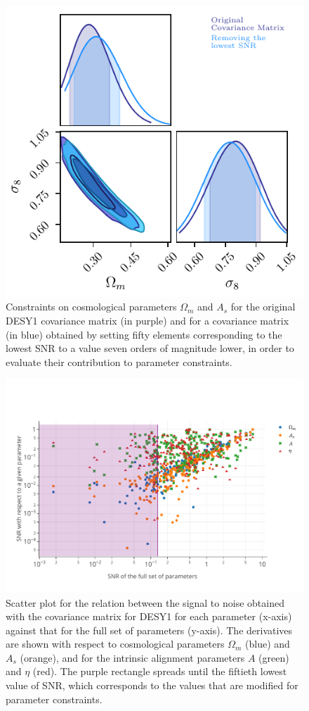 \documentclass[twocolumn]{\docclass}
\begin{document}
	\begin{figure}
		\includegraphics[width=0.9\columnwidth]{SNR/SNR_wm-sigma8.pdf}
		\caption{Constraints on cosmological parameters $\Omega_m$ and $A_s$ for the original DESY1 covariance matrix (in purple) and for a covariance matrix (in blue) obtained by setting fifty elements corresponding to the lowest SNR to a value seven orders of magnitude lower, in order to evaluate their contribution to parameter constraints. \label{fig:signalnoise}}
	\end{figure}
	
	\begin{figure}
		\includegraphics[width=1\columnwidth]{SNR/SNR_cuts.pdf}
		\caption{Scatter plot for the relation between the signal to noise obtained with the covariance matrix for DESY1 for each parameter (x-axis) against that for the full set of parameters (y-axis). The derivatives are shown with respect to cosmological parameters $\Omega_m$ (blue) and $A_s$ (orange), and for the intrinsic alignment parameters $A$ (green) and $\eta$ (red). The purple rectangle spreads until the fiftieth lowest value of SNR, which corresponds to the values that are modified for parameter constraints. \label{fig:signalnoise_cuts}}
	\end{figure}
	
\end{document}

